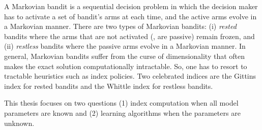 A Markovian bandit is a sequential decision problem in which the decision maker has to activate a set of bandit's arms at each time, and the active arms evolve in a Markovian manner.
There are two types of Markovian bandits: (i) \emph{rested} bandits where the arms that are not activated (\ie, are passive) remain frozen, and (ii) \emph{restless} bandits where the passive arms evolve in a Markovian manner.
In general, Markovian bandits suffer from the curse of dimensionality that often makes the exact solution computationally intractable.
So, one has to resort to tractable heuristics such as index policies.
Two celebrated indices are the Gittins index for rested bandits and the Whittle index for restless bandits.

This thesis focuses on two questions (1) index computation when all model parameters are known and (2) learning algorithms when the parameters are unknown.

